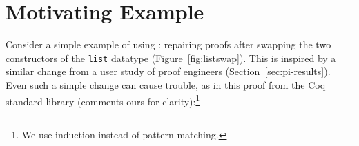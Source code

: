 \section{Motivating Example}
\label{sec:overview}


\begin{figure*}
\begin{minipage}{0.46\textwidth}
   
\end{minipage}
\hfill
\begin{minipage}{0.46\textwidth}
   
\end{minipage}
\vspace{-0.4cm}
\caption{A change from the old version of \lstinline{list} (left) to the new version of \lstinline{list} (right).
Recall that \lstinline{list} is an inductive datatype that is either empty (the \lstinline{nil} constructor), or the result
of placing an element in front of another \lstinline{list} (the \lstinline{cons} constructor). The change swaps these
two constructors ().}
\label{fig:listswap}
\end{figure*}

Consider a simple example of using \toolnamec: repairing proofs after swapping the two constructors of the \lstinline{list} datatype (Figure~\ref{fig:listswap}).
This is inspired by a similar change from a user study of proof engineers (Section~\ref{sec:pi-results}).
Even such a simple change can cause trouble, as in this proof from the Coq standard library (comments ours for clarity):\footnote{We use induction instead of pattern matching.}

